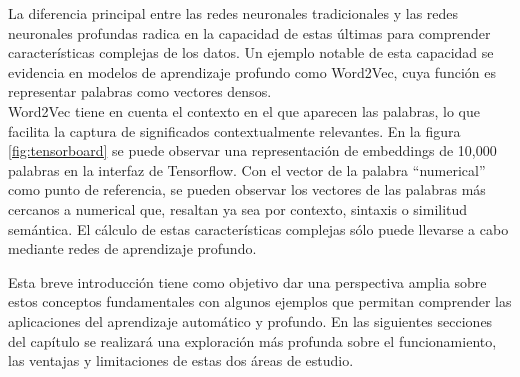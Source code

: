 La diferencia principal entre las redes neuronales tradicionales y las redes neuronales profundas radica en la capacidad de estas últimas para comprender características complejas de los datos. Un ejemplo notable de esta capacidad se evidencia en modelos de aprendizaje profundo como Word2Vec, cuya función es representar palabras como vectores densos.\\
Word2Vec tiene en cuenta el contexto en el que aparecen las palabras, lo que facilita la captura de significados contextualmente relevantes. En la figura \ref{fig:tensorboard}  se puede observar una representación de embeddings de 10,000 palabras en la interfaz de Tensorflow. Con el vector de la palabra ``numerical'' como punto de referencia, se pueden observar los vectores de las palabras más cercanos a numerical que, resaltan ya sea por contexto, sintaxis o similitud semántica. El cálculo de estas características complejas sólo puede llevarse a cabo mediante redes de aprendizaje profundo. 

Esta breve introducción tiene como objetivo dar una perspectiva amplia sobre estos conceptos fundamentales con algunos ejemplos que permitan comprender las aplicaciones del aprendizaje automático y profundo. En las siguientes secciones del capítulo se realizará una exploración más profunda sobre el funcionamiento, las ventajas y limitaciones de estas dos áreas de estudio.


